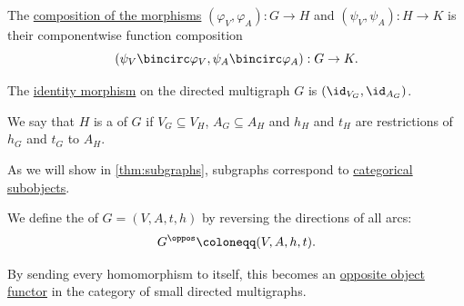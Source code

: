 \begin{definition}
\begin{thmenum}[resume=def:directed_multigraph]
\begin{thmenum}
       The \hyperref[def:category/composition]{composition of the morphisms} \( (\varphi_V, \varphi_A): G \to H \) and \( (\psi_V, \psi_A): H \to K \) is their componentwise function composition
      \begin{equation*}
        (\psi_V \bincirc \varphi_V, \psi_A \bincirc \varphi_A): G \to K.
      \end{equation*}

       The \hyperref[def:category/identity]{identity morphism} on the directed multigraph \( G \) is \( (\id_{V_G}, \id_{A_G}) \).
    \end{thmenum}

    \mimprovised We say that \( H \) is a  of \( G \) if \( V_G \subseteq V_H \), \( A_G \subseteq A_H \) and \( h_H \) and \( t_H \) are restrictions of \( h_G \) and \( t_G \) to \( A_H \).

    As we will show in \cref{thm:subgraphs}, subgraphs correspond to \hyperref[def:categorical_subobject]{categorical subobjects}.

     We define the  of \( G = (V, A, t, h) \) by reversing the directions of all arcs:
    \begin{equation*}
      G^\oppos \coloneqq (V, A, h, t).
    \end{equation*}

    By sending every homomorphism to itself, this becomes an \hyperref[con:opposite_object]{opposite object functor} in the category of small directed multigraphs.
  \end{thmenum}
\end{definition}
